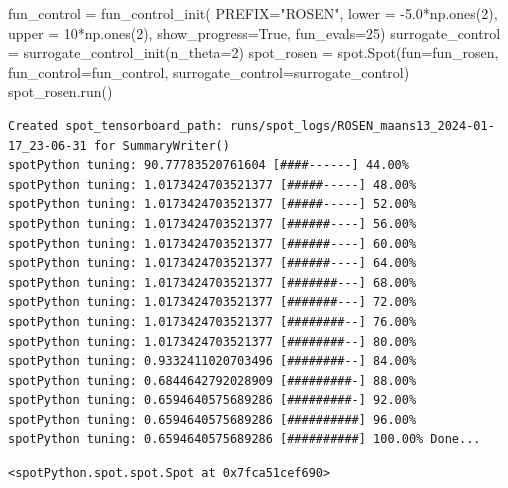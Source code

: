 \documentclass[
  letterpaper,
  DIV=11,
  numbers=noendperiod]{scrreprt}
\newenvironment{Shaded}{\begin{snugshade}}{\end{snugshade}}
\newcommand{\DecValTok}[1]{\textcolor[rgb]{0.68,0.00,0.00}{#1}}
\newcommand{\FloatTok}[1]{\textcolor[rgb]{0.68,0.00,0.00}{#1}}
\newcommand{\NormalTok}[1]{\textcolor[rgb]{0.00,0.23,0.31}{#1}}
\newcommand{\OperatorTok}[1]{\textcolor[rgb]{0.37,0.37,0.37}{#1}}
\newcommand{\StringTok}[1]{\textcolor[rgb]{0.13,0.47,0.30}{#1}}
\newcommand{\VariableTok}[1]{\textcolor[rgb]{0.07,0.07,0.07}{#1}}
\begin{document}
\begin{Shaded}
\begin{Highlighting}[]
\NormalTok{fun\_control }\OperatorTok{=}\NormalTok{ fun\_control\_init(}
\NormalTok{              PREFIX}\OperatorTok{=}\StringTok{"ROSEN"}\NormalTok{,}
\NormalTok{              lower }\OperatorTok{=} \OperatorTok{{-}}\FloatTok{5.0}\OperatorTok{*}\NormalTok{np.ones(}\DecValTok{2}\NormalTok{),}
\NormalTok{              upper }\OperatorTok{=} \DecValTok{10}\OperatorTok{*}\NormalTok{np.ones(}\DecValTok{2}\NormalTok{),}
\NormalTok{              show\_progress}\OperatorTok{=}\VariableTok{True}\NormalTok{,}
\NormalTok{              fun\_evals}\OperatorTok{=}\DecValTok{25}\NormalTok{)}
\NormalTok{surrogate\_control }\OperatorTok{=}\NormalTok{ surrogate\_control\_init(n\_theta}\OperatorTok{=}\DecValTok{2}\NormalTok{)}
\NormalTok{spot\_rosen }\OperatorTok{=}\NormalTok{ spot.Spot(fun}\OperatorTok{=}\NormalTok{fun\_rosen,}
\NormalTok{                  fun\_control}\OperatorTok{=}\NormalTok{fun\_control,}
\NormalTok{                  surrogate\_control}\OperatorTok{=}\NormalTok{surrogate\_control)}
\NormalTok{spot\_rosen.run()}
\end{Highlighting}
\end{Shaded}

\begin{verbatim}
Created spot_tensorboard_path: runs/spot_logs/ROSEN_maans13_2024-01-17_23-06-31 for SummaryWriter()
spotPython tuning: 90.77783520761604 [####------] 44.00% 
spotPython tuning: 1.0173424703521377 [#####-----] 48.00% 
spotPython tuning: 1.0173424703521377 [#####-----] 52.00% 
spotPython tuning: 1.0173424703521377 [######----] 56.00% 
spotPython tuning: 1.0173424703521377 [######----] 60.00% 
spotPython tuning: 1.0173424703521377 [######----] 64.00% 
spotPython tuning: 1.0173424703521377 [#######---] 68.00% 
spotPython tuning: 1.0173424703521377 [#######---] 72.00% 
spotPython tuning: 1.0173424703521377 [########--] 76.00% 
spotPython tuning: 1.0173424703521377 [########--] 80.00% 
spotPython tuning: 0.9332411020703496 [########--] 84.00% 
spotPython tuning: 0.6844642792028909 [#########-] 88.00% 
spotPython tuning: 0.6594640575689286 [#########-] 92.00% 
spotPython tuning: 0.6594640575689286 [##########] 96.00% 
spotPython tuning: 0.6594640575689286 [##########] 100.00% Done...
\end{verbatim}

\begin{verbatim}
<spotPython.spot.spot.Spot at 0x7fca51cef690>
\end{verbatim}
\end{document}
